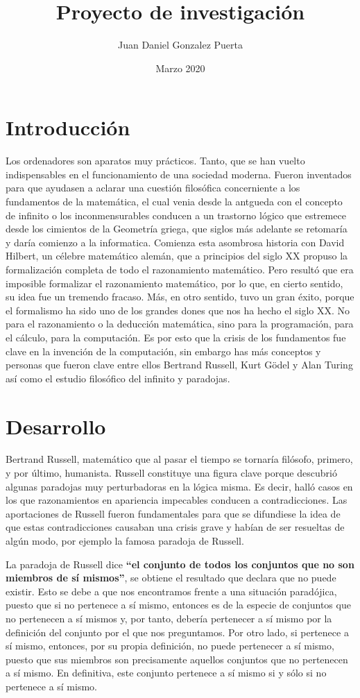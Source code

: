 \documentclass{article}
\title{Proyecto de investigación}
\author{Juan Daniel Gonzalez Puerta}
\date{Marzo 2020}
\begin{document}
\maketitle

\section*{Introducción}
Los ordenadores son aparatos muy prácticos. Tanto, que se han vuelto indispensables en el funcionamiento de una sociedad moderna. Fueron inventados para que ayudasen a aclarar una cuestión filosófica concerniente a los fundamentos de la matemática, el cual venia desde la antgueda con el concepto de infinito o los inconmensurables conducen a un trastorno lógico que estremece desde los cimientos de la Geometría griega, que siglos más adelante se retomaría y daría comienzo a la informatica. Comienza esta asombrosa historia con David Hilbert, un célebre matemático alemán, que a principios del siglo XX propuso la formalización completa de todo el razonamiento matemático. Pero resultó que era imposible formalizar el razonamiento matemático, por lo que, en cierto sentido, su idea fue un tremendo fracaso. Más, en otro sentido, tuvo un gran éxito, porque el formalismo ha sido uno de los grandes dones que nos ha hecho el siglo XX. No para el razonamiento o la deducción matemática, sino para la programación, para el cálculo, para la computación. Es por esto que la crisis de los fundamentos fue clave en la invención de la computación, sin embargo has más conceptos y personas que fueron clave entre ellos Bertrand Russell, Kurt Gödel y Alan Turing así como el estudio filosófico del infinito y paradojas. 

\section*{Desarrollo}
Bertrand Russell, matemático que al pasar el tiempo se tornaría filósofo, primero, y por último, humanista. Russell constituye una figura clave porque descubrió algunas paradojas muy perturbadoras en la lógica misma. Es decir, halló casos en los que razonamientos en apariencia impecables conducen a contradicciones. Las aportaciones de Russell fueron fundamentales para que se difundiese la idea de que estas contradicciones causaban una crisis grave y habían de ser resueltas de algún modo, por ejemplo la famosa paradoja de Russell.


La paradoja de Russell dice \textbf{“el conjunto de todos los conjuntos que no son miembros de sí mismos”}, se obtiene el resultado que declara que no puede existir. Esto se debe a que nos encontramos frente a una situación paradójica, puesto que si no pertenece a sí mismo, entonces es de la especie de conjuntos que no pertenecen a sí mismos y, por tanto, debería pertenecer a sí mismo por la definición del conjunto por el que nos preguntamos. Por otro lado, si pertenece a sí mismo, entonces, por su propia definición, no puede pertenecer a sí mismo, puesto que sus miembros son precisamente aquellos conjuntos que no pertenecen a sí mismo. En definitiva, este conjunto pertenece a sí mismo si y sólo si no pertenece a sí mismo.
\end{document}

